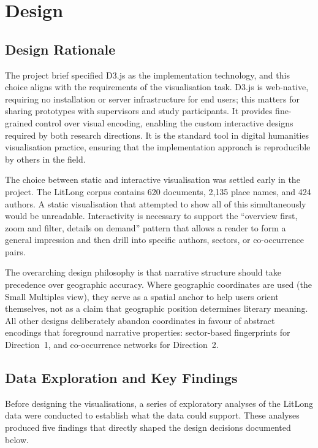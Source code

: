 \documentclass[logo,msc]{infthesis}
\begin{document}
\chapter{Design}
\label{chap:design}
 
\section{Design Rationale}
 
The project brief specified D3.js \cite{bostock2011} as the implementation technology, and this choice aligns with the requirements of the visualisation task. D3.js is web-native, requiring no installation or server infrastructure for end users; this matters for sharing prototypes with supervisors and study participants. It provides fine-grained control over visual encoding, enabling the custom interactive designs required by both research directions. It is the standard tool in digital humanities visualisation practice, ensuring that the implementation approach is reproducible by others in the field.
 
The choice between static and interactive visualisation was settled early in the project. The LitLong corpus contains 620 documents, 2,135 place names, and 424 authors. A static visualisation that attempted to show all of this simultaneously would be unreadable. Interactivity is necessary to support the ``overview first, zoom and filter, details on demand'' pattern \cite{shneiderman1996} that allows a reader to form a general impression and then drill into specific authors, sectors, or co-occurrence pairs.
 
The overarching design philosophy is that narrative structure should take precedence over geographic accuracy. Where geographic coordinates are used (the Small Multiples view), they serve as a spatial anchor to help users orient themselves, not as a claim that geographic position determines literary meaning. All other designs deliberately abandon coordinates in favour of abstract encodings that foreground narrative properties: sector-based fingerprints for Direction~1, and co-occurrence networks for Direction~2.
 
\section{Data Exploration and Key Findings}
\label{sec:dataexploration}
 
Before designing the visualisations, a series of exploratory analyses of the LitLong data were conducted to establish what the data could support. These analyses produced five findings that directly shaped the design decisions documented below.
 
\end{document}
